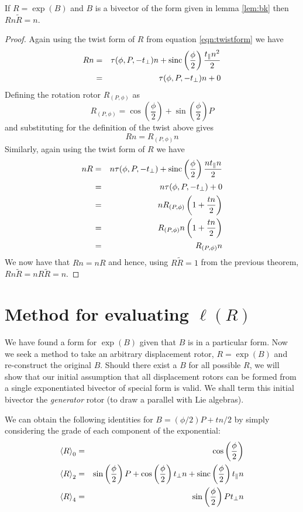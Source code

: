 \begin{thm} If $R = \exp(B)$ and $B$ is a bivector of the form 
given in lemma
\ref{lem:bk} then $Rn\tilde{R} = n$.
\end{thm}
\begin{proof}
Again using the twist form of $R$ from equation \ref{eqn:twistform} we have
\begin{eqnarray*}
Rn & = & \tau(\phi, P, - t_\perp)n + 
\mathrm{sinc}\left(\frac{\phi}{2}\right)\frac{t_\parallel n^2}{2} \\
&=& \tau(\phi, P, - t_\perp)n + 0
\end{eqnarray*}
Defining the rotation rotor $R_{(P,\phi)}$ as
\[
R_{(P,\phi)} = \cos\left(\frac{\phi}{2}\right) +
   \sin\left(\frac{\phi}{2}\right)P
\]
and substituting for the definition of the twist above gives
\[
Rn = R_{(P,\phi)} n
\]
Similarly, again using the twist form of $R$ we have
\begin{eqnarray*}
nR & = & n\tau(\phi, P, - t_\perp) + 
\mathrm{sinc}\left(\frac{\phi}{2}\right)\frac{nt_\parallel n}{2} \\
&=& n\tau(\phi, P, - t_\perp) + 0 \\
&=& n R_{(P,\phi)} \left( 1 + \frac{tn}{2} \right) \\
&=& R_{(P,\phi)} n \left( 1 + \frac{tn}{2} \right) \\
&=& R_{(P,\phi)} n 
\end{eqnarray*}
We now have that $Rn = nR$ and hence, using
$R\tilde{R} = 1$ from the previous theorem, 
$Rn\tilde{R} = nR\tilde{R} = n$.
\end{proof}

\section{Method for evaluating $\ell(R)$}

We have found a form for $\exp(B)$ given that $B$ is in a particular form.
Now we seek a method to take an arbitrary displacement
rotor, $R = \exp(B)$ and re-construct the original $B$. Should there exist
a $B$ for all possible $R$, we will show that our initial assumption
that all displacement rotors can be formed from a single exponentiated bivector
of special form is valid. We shall term this initial bivector
the \emph{generator} rotor (to draw a parallel with Lie algebras).

We can obtain the following identities for $B=(\phi / 2) P + tn / 2$ by simply considering
the grade of each component of the exponential:
\begin{eqnarray*}
\left< R \right>_0 & = & \cos\left(\frac{\phi}{2}\right) \\
\left< R \right>_2 & = & \sin\left(\frac{\phi}{2}\right) P + 
  \cos\left(\frac{\phi}{2}\right) t_\perp n + \mathrm{sinc}\left(\frac{\phi}{2}\right) t_\parallel n \\
\left< R \right>_4 & = & \sin\left(\frac{\phi}{2}\right) Pt_\perp n
\end{eqnarray*}

